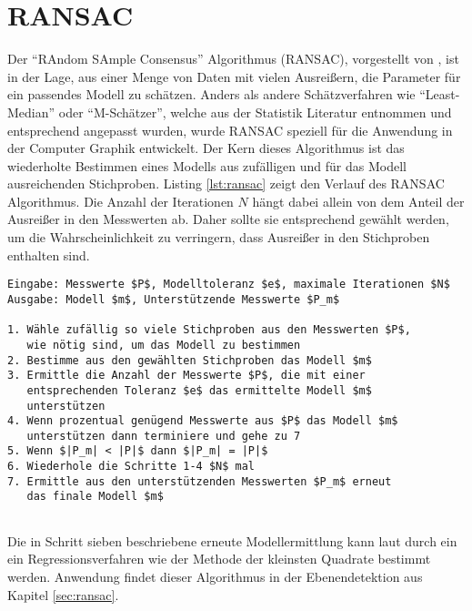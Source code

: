 \section{RANSAC} \label{sec:ransac-theory}

Der \enquote{RAndom SAmple Consensus} Algorithmus (RANSAC), vorgestellt von \citet{fischler1981random}, ist in der Lage, aus einer Menge von Daten mit vielen Ausreißern, die Parameter für ein passendes Modell zu schätzen. Anders als andere Schätzverfahren wie \enquote{Least-Median} oder \enquote{M-Schätzer}, welche aus der Statistik Literatur entnommen und entsprechend angepasst wurden, wurde RANSAC speziell für die Anwendung in der Computer Graphik entwickelt. Der Kern dieses Algorithmus ist das wiederholte Bestimmen eines Modells aus zufälligen und für das Modell ausreichenden Stichproben. Listing \ref{lst:ransac} zeigt den Verlauf des RANSAC Algorithmus. Die Anzahl der Iterationen \(N\) hängt dabei allein von dem Anteil der Ausreißer in den Messwerten ab. Daher sollte sie entsprechend gewählt werden, um die Wahrscheinlichkeit zu verringern, dass Ausreißer in den Stichproben enthalten sind. \citep{derpanis2010overview} \\

\begin{lstlisting}[mathescape,caption=Der RANSAC Algorithmus, label=lst:ransac, float=htbp]
Eingabe: Messwerte $P$, Modelltoleranz $e$, maximale Iterationen $N$
Ausgabe: Modell $m$, Unterstützende Messwerte $P_m$

1. Wähle zufällig so viele Stichproben aus den Messwerten $P$,
   wie nötig sind, um das Modell zu bestimmen
2. Bestimme aus den gewählten Stichproben das Modell $m$
3. Ermittle die Anzahl der Messwerte $P$, die mit einer 
   entsprechenden Toleranz $e$ das ermittelte Modell $m$ 
   unterstützen
4. Wenn prozentual genügend Messwerte aus $P$ das Modell $m$ 
   unterstützen dann terminiere und gehe zu 7
5. Wenn $|P_m| < |P|$ dann $|P_m| = |P|$
6. Wiederhole die Schritte 1-4 $N$ mal
7. Ermittle aus den unterstützenden Messwerten $P_m$ erneut 
   das finale Modell $m$
   
\end{lstlisting} 

Die in Schritt sieben beschriebene erneute Modellermittlung kann laut \citet{fischler1981random} durch ein ein Regressionsverfahren wie der Methode der kleinsten Quadrate bestimmt werden. Anwendung findet dieser Algorithmus in der Ebenendetektion aus Kapitel \ref{sec:ransac}.